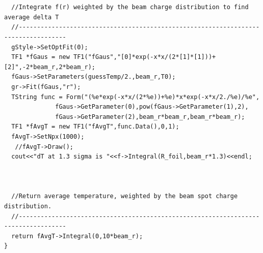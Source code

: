 \documentclass[12pt]{article}
\begin{document}
\begin{lstlisting}
  

  //Integrate f(r) weighted by the beam charge distribution to find average delta T 
  //-----------------------------------------------------------------------------------
  gStyle->SetOptFit(0);
  TF1 *fGaus = new TF1("fGaus","[0]*exp(-x*x/(2*[1]*[1]))+[2]",-2*beam_r,2*beam_r);
  fGaus->SetParameters(guessTemp/2.,beam_r,T0);
  gr->Fit(fGaus,"r");
  TString func = Form("(%e*exp(-x*x/(2*%e))+%e)*x*exp(-x*x/2./%e)/%e",
		      fGaus->GetParameter(0),pow(fGaus->GetParameter(1),2),
		      fGaus->GetParameter(2),beam_r*beam_r,beam_r*beam_r);
  TF1 *fAvgT = new TF1("fAvgT",func.Data(),0,1);
  fAvgT->SetNpx(1000);
   //fAvgT->Draw();
  cout<<"dT at 1.3 sigma is "<<f->Integral(R_foil,beam_r*1.3)<<endl;

  

  //Return average temperature, weighted by the beam spot charge distribution.
  //-----------------------------------------------------------------------------------
  return fAvgT->Integral(0,10*beam_r);
}
\end{lstlisting}
\end{document}
